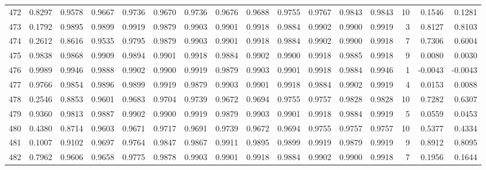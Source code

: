 \begin{tabular}{lrrrrrrrrrrrrrrr}
472 &      0.8297 &  0.9578 &  0.9667 &  0.9736 &  0.9670 &  0.9736 &  0.9676 &  0.9688 &  0.9755 &  0.9767 &   0.9843 &     0.9843 &     10 &                    0.1546 &                     0.1281 \\
473 &      0.1792 &  0.9895 &  0.9899 &  0.9919 &  0.9879 &  0.9903 &  0.9901 &  0.9918 &  0.9884 &  0.9902 &   0.9900 &     0.9919 &      3 &                    0.8127 &                     0.8103 \\
474 &      0.2612 &  0.8616 &  0.9535 &  0.9795 &  0.9879 &  0.9903 &  0.9901 &  0.9918 &  0.9884 &  0.9902 &   0.9900 &     0.9918 &      7 &                    0.7306 &                     0.6004 \\
475 &      0.9838 &  0.9868 &  0.9909 &  0.9894 &  0.9901 &  0.9918 &  0.9884 &  0.9902 &  0.9900 &  0.9918 &   0.9885 &     0.9918 &      9 &                    0.0080 &                     0.0030 \\
476 &      0.9989 &  0.9946 &  0.9888 &  0.9902 &  0.9900 &  0.9919 &  0.9879 &  0.9903 &  0.9901 &  0.9918 &   0.9884 &     0.9946 &      1 &                   -0.0043 &                    -0.0043 \\
477 &      0.9766 &  0.9854 &  0.9896 &  0.9899 &  0.9919 &  0.9879 &  0.9903 &  0.9901 &  0.9918 &  0.9884 &   0.9902 &     0.9919 &      4 &                    0.0153 &                     0.0088 \\
478 &      0.2546 &  0.8853 &  0.9601 &  0.9683 &  0.9704 &  0.9739 &  0.9672 &  0.9694 &  0.9755 &  0.9757 &   0.9828 &     0.9828 &     10 &                    0.7282 &                     0.6307 \\
479 &      0.9360 &  0.9813 &  0.9887 &  0.9902 &  0.9900 &  0.9919 &  0.9879 &  0.9903 &  0.9901 &  0.9918 &   0.9884 &     0.9919 &      5 &                    0.0559 &                     0.0453 \\
480 &      0.4380 &  0.8714 &  0.9603 &  0.9671 &  0.9717 &  0.9691 &  0.9739 &  0.9672 &  0.9694 &  0.9755 &   0.9757 &     0.9757 &     10 &                    0.5377 &                     0.4334 \\
481 &      0.1007 &  0.9102 &  0.9697 &  0.9764 &  0.9847 &  0.9867 &  0.9911 &  0.9895 &  0.9899 &  0.9919 &   0.9879 &     0.9919 &      9 &                    0.8912 &                     0.8095 \\
482 &      0.7962 &  0.9606 &  0.9658 &  0.9775 &  0.9878 &  0.9903 &  0.9901 &  0.9918 &  0.9884 &  0.9902 &   0.9900 &     0.9918 &      7 &                    0.1956 &                     0.1644 \\

\end{tabular}

